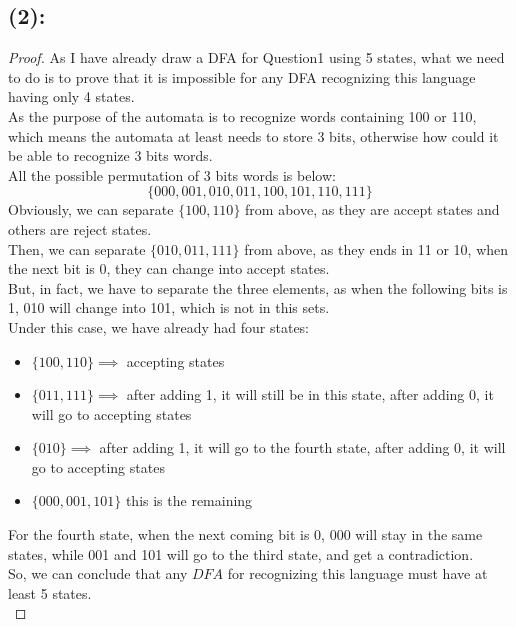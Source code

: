 \documentclass [9 pt]{article}
\theoremstyle{definition}
\begin{document}
\subsection*{(2):}
\begin{proof}
	As I have already draw a DFA for Question1 using 5 states, what we need to do is to prove that it is impossible for any DFA recognizing this language having only 4 states.\\
	\newline
	As the purpose of the automata is to recognize words containing 100 or 110, which means the automata at least needs to store 3 bits, otherwise how could it be able to recognize 3 bits words.\\
	\newline
	All the possible permutation of 3 bits words is below:
	$$\{000, 001, 010, 011, 100, 101, 110, 111 \}$$
	Obviously, we can separate $\{ 100 , 110 \}$ from above, as they are accept states and others are reject states.\\
	\newline
	Then, we can separate $\{ 010, 011, 111 \}$ from above, as they ends in 11 or 10, when the next bit is 0, they can change into accept states.\\
	But, in fact, we have to separate the three elements, as when the following bits is 1, 010 will change into 101, which is not in this sets.\\
	\newline
	Under this case, we have already had four states:
	\begin{itemize}
		\item $\{100, 110\} \implies$ accepting states
		\item $\{011, 111 \} \implies$ after adding 1, it will still be in this state, after adding 0, it will go to accepting states
		\item  $\{010 \} \implies$ after adding 1, it will go to the fourth state, after adding 0, it will go to accepting states
		\item  $\{ 000, 001, 101 \} $ this is the remaining 
	\end{itemize} 
	For the fourth state, when the next coming bit is 0, 000 will stay in the same states, while 001 and 101 will go to the third state,  and get a contradiction. \\
	So, we can conclude that any $DFA$ for recognizing this language must have at least 5 states. \\
\end{proof}
\end{document}
